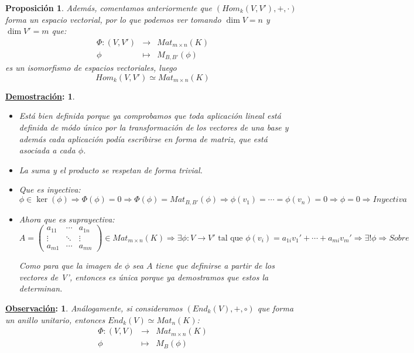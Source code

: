 \documentclass[10pt,a4paper,openright]{book}
\theoremstyle{break}
\newtheorem*{prop}{Proposición}
\newtheorem*{demo}{\underline{Demostración}:}
\newtheorem*{obs}{\underline{Observación}:}
\begin{document}
\begin{prop}
Además, comentamos anteriormente que $(Hom_k(V,V'), +, \cdot )$ forma un espacio vectorial, por lo que podemos ver tomando $\dim V=n$ y $\dim V'=m$ que:
\begin{eqnarray*} \Phi:(V,V') &\longrightarrow& Mat_{m\times n}(K)\\ \phi &\longmapsto& M_{B,B'}(\phi) 
\end{eqnarray*} 
es un isomorfismo de espacios vectoriales, luego
$$Hom_k(V,V')\simeq Mat_{m\times n}(K)$$
\end{prop}
\begin{demo}
\begin{itemize}
\item Está bien definida porque ya comprobamos que toda aplicación lineal está definida de módo único por la transformación de los vectores de una base y además cada aplicación podía escribirse en forma de matriz, que está asociada a cada $\phi$.

\item La suma y el producto se respetan de forma trivial.

\item Que es inyectiva:
$$\phi\in \ker(\phi)\Rightarrow \Phi(\phi)=0\Rightarrow \Phi(\phi)=Mat_{B,B'}(\phi)\Rightarrow \phi(v_1)=\cdots=\phi(v_n)=0\Rightarrow \phi=0\Rightarrow Inyectiva$$

\item Ahora que es suprayectiva:
$$A=\begin{pmatrix}
a_{11} & \cdots & a_{1n} \\ \vdots & \ddots & \vdots \\ a_{m1} & \cdots & a_{mn}\end{pmatrix}\in Mat_{m\times n}(K)\Rightarrow \exists \phi: V\longrightarrow V'\mbox{ tal que }\phi(v_i)=a_{1i}v_1'+\cdots+a_{mi}v_m'\Rightarrow \exists!\phi\Rightarrow Sobre$$

Como para que la imagen de $\phi$ sea $A$ tiene que definirse a partir de los vectores de V', entonces es única porque ya demostramos que estos la determinan.
\end{itemize}
\end{demo}

\begin{obs}
Análogamente, si consideramos $(End_k(V), +, \circ)$ que forma un anillo unitario, entonces $End_k(V)\simeq Mat_n(K)$:
\begin{eqnarray*} \Phi:(V,V) &\longrightarrow& Mat_{m\times n}(K)\\ \phi &\longmapsto& M_{B}(\phi) 
\end{eqnarray*} 
\end{obs}
\end{document}
